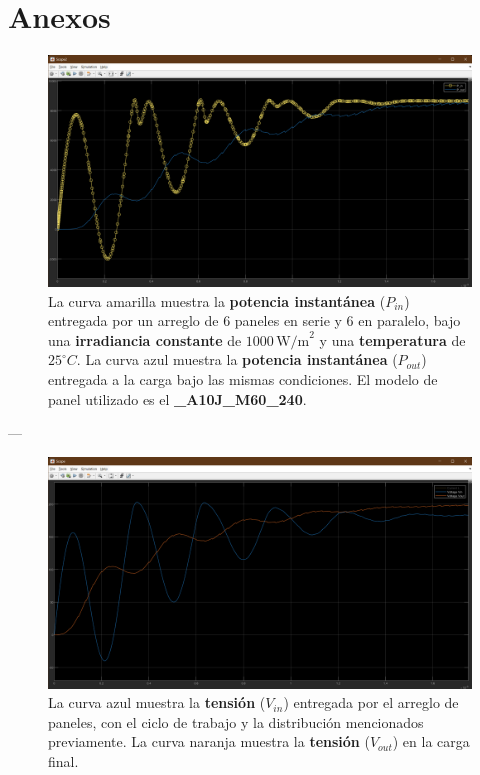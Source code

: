 \section{Anexos}
\begin{figure}[ht!]
    \centering
    \includegraphics[width=0.9\linewidth]{fot/Ps.png} %
    \caption{La curva amarilla muestra la \textbf{potencia instantánea} ($P_{in}$) entregada por un arreglo de 6 paneles en serie y 6 en paralelo, bajo una \textbf{irradiancia constante} de $1000 \, \text{W/m}^2$ y una \textbf{temperatura} de $25^\circ C$. La curva azul muestra la \textbf{potencia instantánea} ($P_{out}$) entregada a la carga bajo las mismas condiciones. El modelo de panel utilizado es el \textbf{\_A10J\_M60\_240}.}
    \label{fig:Ps}
\end{figure}

---

\begin{figure}[ht!]
    \centering
    \includegraphics[width=0.9\linewidth]{fot/Vs.png} %
    \caption{La curva azul muestra la \textbf{tensión} ($V_{in}$) entregada por el arreglo de paneles, con el ciclo de trabajo y la distribución mencionados previamente. La curva naranja muestra la \textbf{tensión} ($V_{out}$) en la carga final.}
    \label{fig:Vs}
\end{figure}


